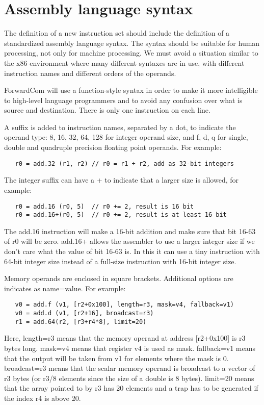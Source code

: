 \documentclass[forwardcom.tex]{subfiles}
\begin{document}
\RaggedRight


\section{Assembly language syntax} \label{assemblySyntax}
The definition of a new instruction set should include the definition of a standardized assembly language syntax. The syntax should be suitable for human processing, not only for machine processing. We must avoid a situation similar to the x86 environment where many different syntaxes are in use, with different instruction names and different orders of the operands. 
\vspace{2mm}

ForwardCom will use a function-style syntax in order to make it more intelligible to high-level language programmers and to avoid any confusion over what is source and destination. There is only one instruction on each line.

\vspace{2mm}
A suffix is added to instruction names, separated by a dot, to indicate the operand type: 8, 16, 32, 64, 128 for integer operand size, and f, d, q for single, double and quadruple precision floating point operands. For example:
\begin{lstlisting}
   r0 = add.32 (r1, r2) // r0 = r1 + r2, add as 32-bit integers
\end{lstlisting}

The integer suffix can have a + to indicate that a larger size is allowed, for example:
\begin{lstlisting}
   r0 = add.16 (r0, 5)  // r0 += 2, result is 16 bit
   r0 = add.16+(r0, 5)  // r0 += 2, result is at least 16 bit
\end{lstlisting}

The add.16 instruction will make a 16-bit addition and make sure that bit 16-63 of r0 will be zero. add.16+ allows the assembler to use a larger integer size if we don't care what the value of bit 16-63 is. In this it can use a tiny instruction with 64-bit integer size instead of a full-size instruction with 16-bit integer size.

\vspace{2mm}
Memory operands are enclosed in square brackets. Additional options are indicates as name=value. For example:

\begin{lstlisting}
   v0 = add.f (v1, [r2+0x100], length=r3, mask=v4, fallback=v1)
   v0 = add.d (v1, [r2+16], broadcast=r3)
   r1 = add.64(r2, [r3+r4*8], limit=20)
\end{lstlisting}
Here, length=r3 means that the memory operand at address [r2+0x100] is r3 bytes long. mask=v4 means that register v4 is used as mask. fallback=v1 means that the output will be taken from v1 for elements where the mask is 0. broadcast=r3 means that the scalar memory operand is broadcast to a vector of r3 bytes (or r3/8 elements since the size of a double is 8 bytes). limit=20 means that the array pointed to by r3 has 20 elements and a trap has to be generated if the index r4 is above 20.
\end{document}
